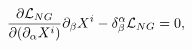 \begin{equation}
{\partial{\cal L}_{NG}\over \partial (\partial_\alpha
X^i)}\partial_\beta X^i - \delta^\alpha_\beta {\cal L}_{NG} = 0,
\end{equation}

